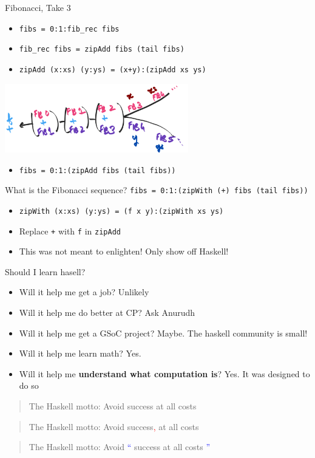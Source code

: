 \documentclass[8pt]{beamer}
\newcommand{\hs}[1]{\texttt{#1}}
\begin{document}
\begin{frame}[fragile]{Fibonacci, Take 3}
\begin{itemize}
\item \hs{fibs = 0:1:fib_rec fibs}\pause
\item \hs{fib_rec fibs = zipAdd fibs (tail fibs)}\pause
\item \hs{zipAdd (x:xs) (y:ys) = (x+y):(zipAdd xs ys)}\pause
\end{itemize}
\pause
\includegraphics[height=3cm]{./zipper.png}
\pause
\begin{itemize}
\item \hs{fibs = 0:1:(zipAdd fibs (tail fibs))}\pause
\end{itemize}

\begin{definition}{What is the Fibonacci sequence?}
\hs{fibs = 0:1:(zipWith (+) fibs (tail fibs))}
\end{definition}
\pause
\begin{itemize}
\item \hs{zipWith  (x:xs) (y:ys) = (f x y):(zipWith xs ys)}
\item Replace \hs{+} with \hs{f} in \hs{zipAdd} \pause
\item This was not meant to enlighten! Only show off Haskell!
\end{itemize}
\end{frame}


\begin{frame}[fragile]{Should I learn hasell?}
\pause
\begin{itemize}
\item Will it help me get a job? \pause Unlikely \pause
\item Will it help me do better at CP? \pause Ask Anurudh \pause
\item Will it help me get a GSoC project? \pause Maybe. The haskell community is small! \pause
\item Will it help me learn math? \pause Yes. \pause
\item Will it help me \textbf{understand what computation is}? \pause Yes. It was designed to do so \pause
\end{itemize}

\pause
\begin{quote}
    The Haskell motto: Avoid success at all costs
\end{quote}
\pause
\begin{quote}
    The Haskell motto: Avoid success\textcolor{red}{,} at all costs
\end{quote}
\pause
\begin{quote}
    The Haskell motto: Avoid \textcolor{blue}{``} success at all costs \textcolor{blue}{''}
\end{quote}
\end{frame}
\end{document}
